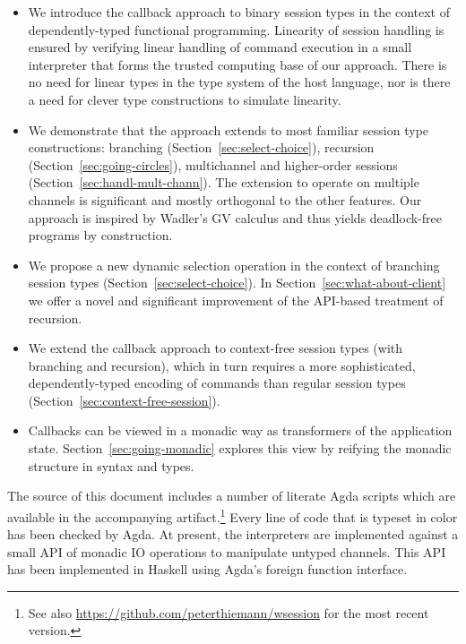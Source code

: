 \documentclass[acmsmall,screen]{acmart}
\begin{document}
\begin{itemize}
\item We introduce the callback approach to binary session
  types in the context of dependently-typed functional
  programming.
  Linearity of session handling is ensured by verifying linear
  handling of command execution in a small interpreter that forms the
  trusted computing base of our approach. There is no need for linear
  types in the type system of the host language, nor is there a need
  for clever type constructions to simulate linearity.
\item We demonstrate that the approach extends to most familiar
  session type constructions: branching
  (Section~\ref{sec:select-choice}), recursion
  (Section~\ref{sec:going-circles}), multichannel and
  higher-order sessions (Section~\ref{sec:handl-mult-chann}). 
  The extension to operate on multiple channels is significant and
  mostly orthogonal to the other features. Our approach is inspired by
  Wadler's GV calculus \cite{DBLP:journals/jfp/Wadler14} and thus
  yields deadlock-free programs by construction. 
\item We propose a new dynamic selection operation in the context of
  branching session types (Section~\ref{sec:select-choice}).
  In Section~\ref{sec:what-about-client} we offer a novel and significant
  improvement of the API-based treatment of recursion.
\item We extend the callback approach to context-free session types
  (with branching and recursion), which in turn requires a more
  sophisticated, dependently-typed encoding of commands than regular
  session types (Section~\ref{sec:context-free-session}).
\item Callbacks can be viewed in a monadic way as transformers of the
  application state. Section~\ref{sec:going-monadic} explores this
  view by reifying the monadic structure in syntax and types.
\end{itemize}

The source of this document includes a number of literate Agda
scripts which are available in the accompanying artifact.\footnote{See
also \url{https://github.com/peterthiemann/wsession} for the most
recent version.} Every line 
of code that is typeset in color has been checked by Agda. At present,
the interpreters are implemented against a small API of monadic IO
operations to manipulate untyped channels. This API has been
implemented in Haskell using Agda's foreign function interface.
\end{document}
